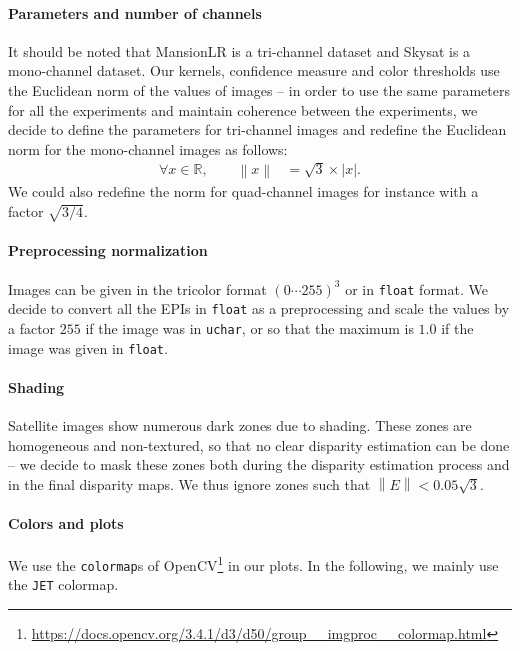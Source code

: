 \documentclass{article}
\newcommand{\abs} [1] {\left| #1 \right|}
\newcommand{\norm}[1]{\left\lVert#1\right\rVert}
\def\R{\mathbb{R}}
\theoremstyle{definition}
\begin{document}
\paragraph{Parameters and number of channels} It should be noted that MansionLR is a tri-channel dataset and Skysat is a mono-channel dataset. Our kernels, confidence measure and color thresholds use the Euclidean norm of the values of images -- in order to use the same parameters for all the experiments and maintain coherence between the experiments, we decide to define the parameters for tri-channel images and redefine the Euclidean norm for the mono-channel images as follows:
\begin{align}
 \forall x \in \R, \qquad \norm{x} &= \sqrt{3} \times \abs{x}.
\end{align}
We could also redefine the norm for quad-channel images for instance with a factor $\sqrt{3/4}$.


\paragraph{Preprocessing normalization} Images can be given in the tricolor format $(0\cdots 255)^3$ or in \verb#float# format. We decide to convert all the EPIs in \verb#float# as a preprocessing and scale the values by a factor $255$ if the image was in \verb#uchar#, or so that the maximum is $1.0$ if the image was given in \verb#float#. 


\paragraph{Shading} Satellite images show numerous dark zones due to shading. These zones are homogeneous and non-textured, so that no clear disparity estimation can be done -- we decide to mask these zones both during the disparity estimation process and in the final disparity maps. We thus ignore zones such that $\norm{E} < 0.05 \sqrt{3}$.


\paragraph{Colors and plots} We use the \verb#colormap#s of OpenCV\footnote{\url{https://docs.opencv.org/3.4.1/d3/d50/group__imgproc__colormap.html}} in our plots. In the following, we mainly use the \verb#JET# colormap.%
\end{document}
